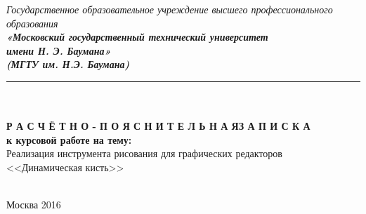 


\begin{center}
	\hfill \break
	\textit{
		\normalsize{Государственное образовательное учреждение высшего профессионального образования}}\\ 
	
	\textit{
		\normalsize  {\bf  «Московский государственный технический университет}\\ 
		\normalsize  {\bf имени Н. Э. Баумана»}\\
		\normalsize  {\bf (МГТУ им. Н.Э. Баумана)}\\
	}
	\noindent\rule{\textwidth}{2pt}
	\hfill \break
	\noindent
	\\
	\noindent
	\\
	\hfill\break
	\hfill \break
	\hfill \break
	\hfill \break
	\normalsize{\bf Р А С Ч Ё Т Н О - П О Я С Н И Т Е Л Ь Н А Я\space\space З А П И С К А}\\
	\normalsize{\bf к курсовой работе на тему:}\\
	\hfill \break
	\large{Реализация инструмента рисования для графических редакторов <<Динамическая кисть>>}\\
	\hfill \break
	\hfill \break
	\hfill \break
	\hfill \break
	\hfill \break
	\normalsize {
		\noindent
		\makebox[\textwidth][c]{}%
	}\\
	\hfill \break
	
	\normalsize {
		\noindent
		\makebox[\textwidth][c]{}%
	}
	\hfill \break
	\hfill \break
	\hfill \break
	\hfill \break
\end{center}

\hfill \break
\hfill \break
\begin{center} Москва 2016 \end{center}
\thispagestyle{empty} %


